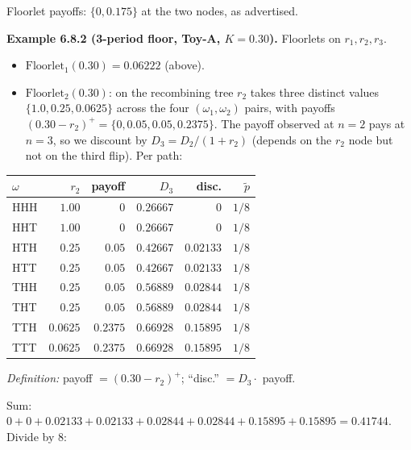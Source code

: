 \documentclass[
  10pt,
  twoside]{book}
\newcounter{none} %
\providecommand{\tightlist}{%
  \setlength{\itemsep}{0pt}\setlength{\parskip}{0pt}}
\begin{document}
Floorlet payoffs: \(\{0, 0.175\}\) at the two nodes, as advertised.

\textbf{Example 6.8.2 (3-period floor, Toy-A, \(K = 0.30\)).} Floorlets
on \(r_1, r_2, r_3\).

\begin{itemize}
\tightlist
\item
  \(\text{Floorlet}_1(0.30) = 0.06222\) (above).
\item
  \(\text{Floorlet}_2(0.30)\): on the recombining tree \(r_2\) takes
  three distinct values \(\{1.0, 0.25, 0.0625\}\) across the four
  \((\omega_1, \omega_2)\) pairs, with payoffs
  \((0.30 - r_2)^+ = \{0, 0.05, 0.05, 0.2375\}\). The payoff observed at
  \(n = 2\) pays at \(n = 3\), so we discount by \(D_3 = D_2/(1+r_2)\)
  (depends on the \(r_2\) node but not on the third flip). Per path:
\end{itemize}

{\def\LTcaptype{none} %
\begin{table}[H]
\centering
\begin{tabular}{|l|r|r|r|r|r|}
\toprule
\(\omega\) & \(r_2\) & payoff & \(D_3\) & disc. & \(\tilde p\) \\
\midrule



HHH & \(1.00\) & \(0\) & \(0.26667\) & \(0\) & \(1/8\) \\
HHT & \(1.00\) & \(0\) & \(0.26667\) & \(0\) & \(1/8\) \\
HTH & \(0.25\) & \(0.05\) & \(0.42667\) & \(0.02133\) & \(1/8\) \\
HTT & \(0.25\) & \(0.05\) & \(0.42667\) & \(0.02133\) & \(1/8\) \\
THH & \(0.25\) & \(0.05\) & \(0.56889\) & \(0.02844\) & \(1/8\) \\
THT & \(0.25\) & \(0.05\) & \(0.56889\) & \(0.02844\) & \(1/8\) \\
TTH & \(0.0625\) & \(0.2375\) & \(0.66928\) & \(0.15895\) & \(1/8\) \\
TTT & \(0.0625\) & \(0.2375\) & \(0.66928\) & \(0.15895\) & \(1/8\) \\
\bottomrule
\end{tabular}
\end{table}
}

\emph{Definition:} payoff \(= (0.30 - r_2)^+\); ``disc.''
\(= D_3 \cdot\) payoff.

Sum:
\(0 + 0 + 0.02133 + 0.02133 + 0.02844 + 0.02844 + 0.15895 + 0.15895 = 0.41744.\)
Divide by 8:
\end{document}
